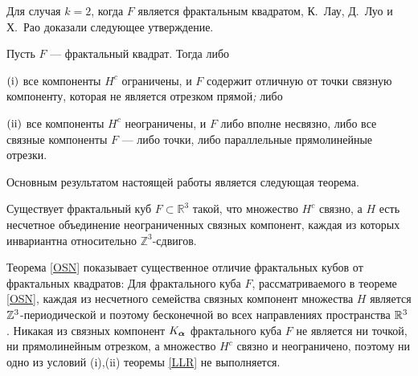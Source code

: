 Для случая $k=2$, когда $F$ является фрактальным квадратом, К.~Лау, Д.~Луо и Х.~Рао  доказали следующее утверждение.
\begin{theorem}\label{LLR}
Пусть $F$ --- фрактальный квадрат. Тогда  либо

$\rm (i)$ все компоненты $H^c$  ограничены, и $F$ содержит отличную от точки связную компоненту, которая не является отрезком прямой\emph{;} либо

$\rm (ii)$ все компоненты $H^c$  неограничены, и  $F$ либо вполне несвязно, либо все  связные компоненты $F$ --- либо точки, либо параллельные прямолинейные отрезки.
\end{theorem}

Основным результатом настоящей работы является следующая теорема.
\begin{theorem}\label{OSN}
Существует фрактальный куб  $F\subset \mathbb{R}^3$ такой, что множество $H^c$ связно, а $H$ есть несчетное объединение неограниченных связных компонент, каждая из которых инвариантна относительно $\mathbb{Z}^3$-сдвигов.
\end{theorem}

Теорема \ref{OSN} показывает существенное отличие фрактальных кубов от фрактальных квадратов:
Для фрактального куба $F$, рассматриваемого в теореме \ref{OSN}, каждая из несчетного семейства связных компонент множества $H$ является $\mathbb{Z}^3$-периодической и поэтому бесконечной во всех направлениях пространства $\mathbb{R}^3$. Никакая из связных компонент $K_{\bm{\alpha}}$ фрактального куба $F$ не является ни точкой, ни прямолинейным отрезком, а множество $H^c$ связно и неограничено, поэтому ни одно из условий (i),(ii) теоремы \ref{LLR} не выполняется.

